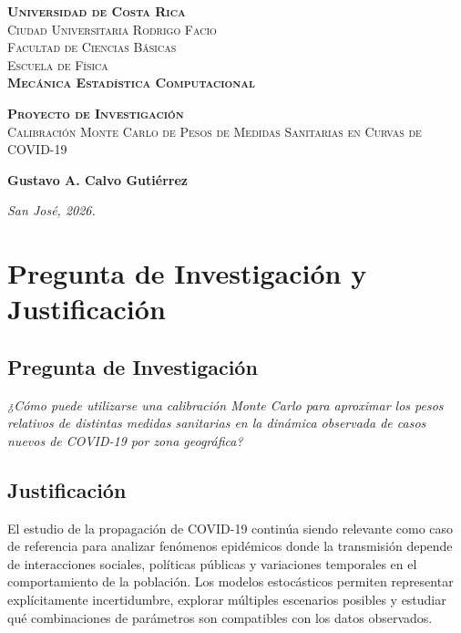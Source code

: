 \documentclass[12pt]{article}
\newcommand{\institucion}{Universidad de Costa Rica}
\newcommand{\campus}{Ciudad Universitaria Rodrigo Facio}
\newcommand{\facultad}{Facultad de Ciencias Básicas}
\newcommand{\escuela}{Escuela de Física}
\newcommand{\curso}{Mecánica Estadística Computacional}
\newcommand{\tituloanteproyecto}{Proyecto de Investigación}
\newcommand{\titulo}{Calibración Monte Carlo de Pesos de Medidas Sanitarias en Curvas de COVID-19}
\newcommand{\autor}{Gustavo A. Calvo Gutiérrez}
\newcommand{\lugarfecha}{San José, 2026.}
\begin{document}
\begin{titlepage}
  \begin{center}
    \LARGE \textbf{\textsc{\institucion}}
    \Large
    \\[1cm]
    \textsc{\campus}
    \\[0.1cm]
    \textsc{\facultad}
    \\[0.1cm]
    \textsc{\escuela} \\
    \vspace*{20 mm}
    \LARGE{\textsc{\textbf{\curso}}}
  \end{center}

  \vspace{2cm}

  \hrulefill
  \begin{center}
    \large \textbf{\textsc{\tituloanteproyecto}}
    \\[0.5cm]
    \textsc{\titulo}
  \end{center}
  \hrulefill

  \vfill

  \begin{center}
    \large \textbf{\autor}
  \end{center}

  \vspace{1cm}

  \begin{center}
    \textit{\lugarfecha}
  \end{center}
\end{titlepage}

\section{Pregunta de Investigación y Justificación}

\subsection{Pregunta de Investigación}

\noindent
\textit{
  ¿Cómo puede utilizarse una calibración Monte Carlo para aproximar los pesos
  relativos de distintas medidas sanitarias en la dinámica observada de casos
  nuevos de COVID-19 por zona geográfica?
}

\subsection{Justificación}

El estudio de la propagación de COVID-19 continúa siendo relevante como caso de
referencia para analizar fenómenos epidémicos donde la transmisión depende de
interacciones sociales, políticas públicas y variaciones temporales en el
comportamiento de la población. Los modelos estocásticos permiten representar
explícitamente incertidumbre, explorar múltiples escenarios posibles y estudiar
qué combinaciones de parámetros son compatibles con los datos observados.
\end{document}
